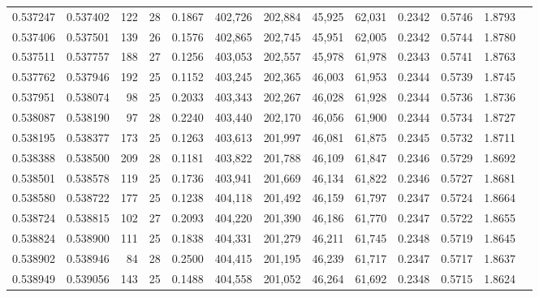 \begin{tabular}{rrrrrrrrrrrrr}
0.537247 & 0.537402 &   122 &  28 &                                     0.1867 & 402,726 & 202,884 &  45,925 &  62,031 & 0.2342 & 0.5746 & 1.8793 \\
0.537406 & 0.537501 &   139 &  26 &                                     0.1576 & 402,865 & 202,745 &  45,951 &  62,005 & 0.2342 & 0.5744 & 1.8780 \\
0.537511 & 0.537757 &   188 &  27 &                                     0.1256 & 403,053 & 202,557 &  45,978 &  61,978 & 0.2343 & 0.5741 & 1.8763 \\
0.537762 & 0.537946 &   192 &  25 &                                     0.1152 & 403,245 & 202,365 &  46,003 &  61,953 & 0.2344 & 0.5739 & 1.8745 \\
0.537951 & 0.538074 &    98 &  25 &                                     0.2033 & 403,343 & 202,267 &  46,028 &  61,928 & 0.2344 & 0.5736 & 1.8736 \\
0.538087 & 0.538190 &    97 &  28 &                                     0.2240 & 403,440 & 202,170 &  46,056 &  61,900 & 0.2344 & 0.5734 & 1.8727 \\
0.538195 & 0.538377 &   173 &  25 &                                     0.1263 & 403,613 & 201,997 &  46,081 &  61,875 & 0.2345 & 0.5732 & 1.8711 \\
0.538388 & 0.538500 &   209 &  28 &                                     0.1181 & 403,822 & 201,788 &  46,109 &  61,847 & 0.2346 & 0.5729 & 1.8692 \\
0.538501 & 0.538578 &   119 &  25 &                                     0.1736 & 403,941 & 201,669 &  46,134 &  61,822 & 0.2346 & 0.5727 & 1.8681 \\
0.538580 & 0.538722 &   177 &  25 &                                     0.1238 & 404,118 & 201,492 &  46,159 &  61,797 & 0.2347 & 0.5724 & 1.8664 \\
0.538724 & 0.538815 &   102 &  27 &                                     0.2093 & 404,220 & 201,390 &  46,186 &  61,770 & 0.2347 & 0.5722 & 1.8655 \\
0.538824 & 0.538900 &   111 &  25 &                                     0.1838 & 404,331 & 201,279 &  46,211 &  61,745 & 0.2348 & 0.5719 & 1.8645 \\
0.538902 & 0.538946 &    84 &  28 &                                     0.2500 & 404,415 & 201,195 &  46,239 &  61,717 & 0.2347 & 0.5717 & 1.8637 \\
0.538949 & 0.539056 &   143 &  25 &                                     0.1488 & 404,558 & 201,052 &  46,264 &  61,692 & 0.2348 & 0.5715 & 1.8624 \\

\end{tabular}
